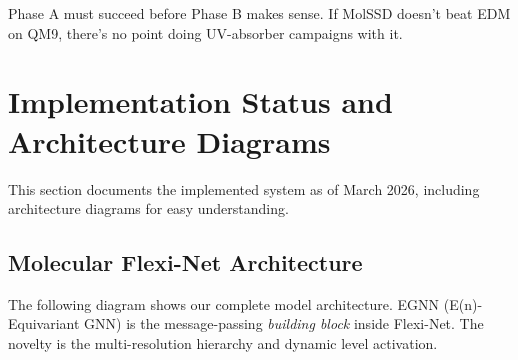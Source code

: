 \documentclass[12pt,a4paper]{article}
\begin{document}
Phase A must succeed before Phase B makes sense. If MolSSD doesn't beat EDM on QM9, there's no point doing UV-absorber campaigns with it.


\section{Implementation Status and Architecture Diagrams}
\label{sec:implementation-status}

This section documents the implemented system as of March 2026, including architecture diagrams for easy understanding.

\subsection{Molecular Flexi-Net Architecture}

The following diagram shows our complete model architecture. EGNN (E(n)-Equivariant GNN) is the message-passing \emph{building block} inside Flexi-Net. The novelty is the multi-resolution hierarchy and dynamic level activation.
\end{document}
